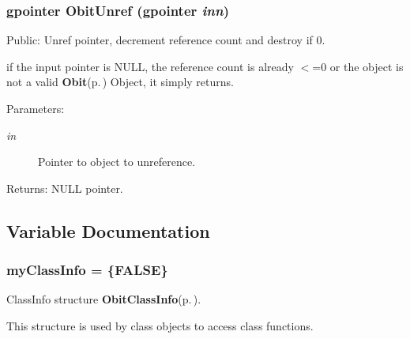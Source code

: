 \subsubsection{\setlength{\rightskip}{0pt plus 5cm}gpointer Obit\-Unref (gpointer {\em inn})}\label{Obit_8c_a9}


Public: Unref pointer, decrement reference count and destroy if 0. 

if the input pointer is NULL, the reference count is already $<$=0 or the object is not a valid {\bf Obit}{\rm (p.\,\pageref{structObit})} Object, it simply returns. \begin{Desc}
\item[Parameters:]
\begin{description}
\item[{\em in}]Pointer to object to unreference. \end{description}
\end{Desc}
\begin{Desc}
\item[Returns:]NULL pointer. \end{Desc}


\subsection{Variable Documentation}
\subsubsection{ {\bf my\-Class\-Info} = \{FALSE\}}\label{Obit_8c_a1}


Class\-Info structure {\bf Obit\-Class\-Info}{\rm (p.\,\pageref{structObitClassInfo})}. 

This structure is used by class objects to access class functions. 